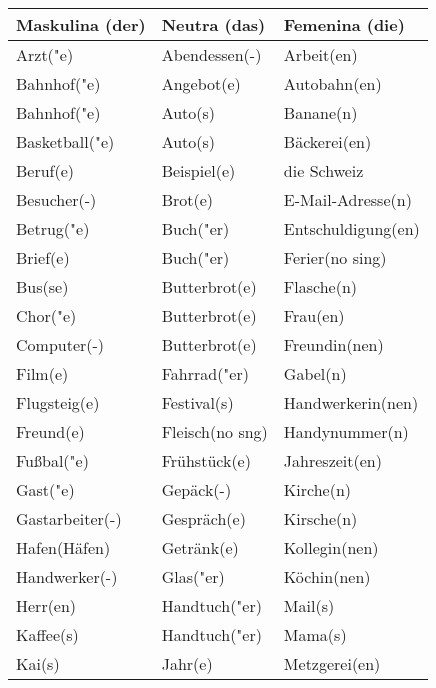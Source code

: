 \documentclass{article}
\renewcommand{\arraystretch}{1}
\begin{document}
\begin{table}[h!]
    \centering
    \label{tab:tabla1}
    \renewcommand{\arraystretch}{1.5}
    \begin{tabular}{|>{\raggedright\arraybackslash}p{5cm}|>{\raggedright\arraybackslash}p{5cm}|>{\raggedright\arraybackslash}p{5cm}|}
        \hline
        \rowcolor{gray!20} \textbf{Maskulina (der)} & \textbf{Neutra (das)} & \textbf{Femenina (die)} \\
        \hline
        Arzt("e) & Abendessen(-) & Arbeit(en) \\\hline
        Bahnhof("e) & Angebot(e) & Autobahn(en) \\\hline
        Bahnhof("e) & Auto(s) & Banane(n) \\\hline
        Basketball("e) & Auto(s) & Bäckerei(en) \\\hline
        Beruf(e) & Beispiel(e) & die Schweiz \\\hline
        Besucher(-) & Brot(e) & E-Mail-Adresse(n) \\\hline
        Betrug("e) & Buch("er) & Entschuldigung(en) \\\hline
        Brief(e) & Buch("er) & Ferier(no sing) \\\hline
        Bus(se) & Butterbrot(e) & Flasche(n) \\\hline
        Chor("e) & Butterbrot(e) & Frau(en) \\\hline
        Computer(-) & Butterbrot(e) & Freundin(nen) \\\hline
        Film(e) & Fahrrad("er) & Gabel(n) \\\hline
        Flugsteig(e) & Festival(s) & Handwerkerin(nen) \\\hline
        Freund(e) & Fleisch(no sng) & Handynummer(n) \\\hline
        Fu\ss{}bal("e) & Frühstück(e) & Jahreszeit(en) \\\hline
        Gast("e) & Gepäck(-) & Kirche(n) \\\hline
        Gastarbeiter(-) & Gespräch(e) & Kirsche(n) \\\hline
        Hafen(Häfen) & Getränk(e) & Kollegin(nen) \\\hline
        Handwerker(-) & Glas("er) & Köchin(nen) \\\hline
        Herr(en) & Handtuch("er) & Mail(s) \\\hline
        Kaffee(s) & Handtuch("er) & Mama(s) \\\hline
        Kai(s) & Jahr(e) & Metzgerei(en) \\\hline

\end{tabular}
\end{table}
\end{document}
